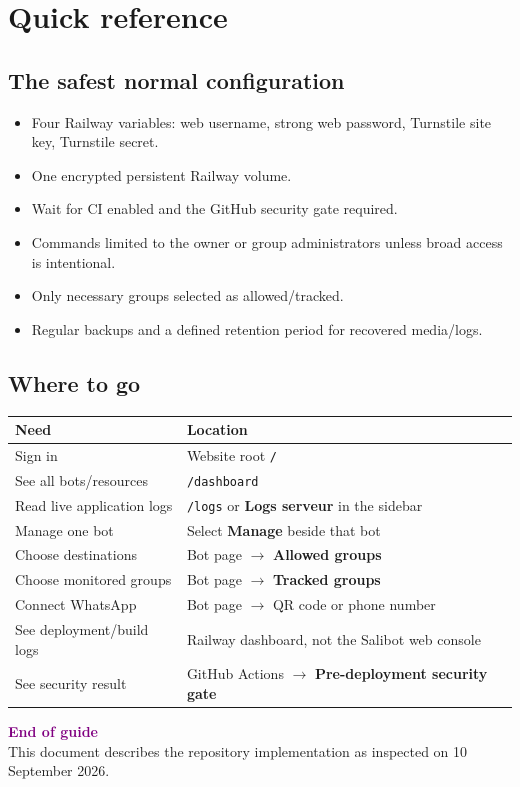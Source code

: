 \documentclass[11pt,a4paper]{article}
\begin{document}
\section{Quick reference}

\subsection{The safest normal configuration}

\begin{itemize}
  \item Four Railway variables: web username, strong web password, Turnstile site key, Turnstile secret.
  \item One encrypted persistent Railway volume.
  \item Wait for CI enabled and the GitHub security gate required.
  \item Commands limited to the owner or group administrators unless broad access is intentional.
  \item Only necessary groups selected as allowed/tracked.
  \item Regular backups and a defined retention period for recovered media/logs.
\end{itemize}

\subsection{Where to go}

\begin{tabularx}{\textwidth}{p{}X}
\toprule
\textbf{Need} & \textbf{Location}\\
\midrule
Sign in & Website root \texttt{/}\\
See all bots/resources & \texttt{/dashboard}\\
Read live application logs & \texttt{/logs} or \textbf{Logs serveur} in the sidebar\\
Manage one bot & Select \textbf{Manage} beside that bot\\
Choose destinations & Bot page $\rightarrow$ \textbf{Allowed groups}\\
Choose monitored groups & Bot page $\rightarrow$ \textbf{Tracked groups}\\
Connect WhatsApp & Bot page $\rightarrow$ QR code or phone number\\
See deployment/build logs & Railway dashboard, not the Salibot web console\\
See security result & GitHub Actions $\rightarrow$ \textbf{Pre-deployment security gate}\\
\bottomrule
\end{tabularx}

\vfill
\begin{center}
\textcolor{purple}{\textbf{End of guide}}\\[2mm]
This document describes the repository implementation as inspected on 10 September 2026.
\end{center}
\end{document}
